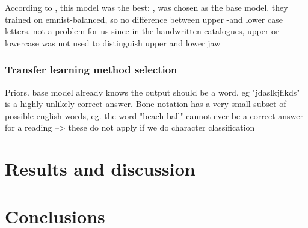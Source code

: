 \documentclass{article}
\begin{document}
According to \cite{emnistclassifiersurvey}, this model was the best: \cite{jamilemnist}, was chosen as the base model.
they trained on emnist-balanced, so no difference between upper -and lower case letters. not a problem for us since 
in the handwritten catalogues, upper or lowercase was not used to distinguish upper and lower jaw

\subsubsection{Transfer learning method selection}
Priors. base model already knows the output should be a word, eg "jdaslkjflkds" is a highly unlikely
correct answer.
Bone notation has a very small subset of possible english words, eg. the word "beach ball" cannot ever be a correct 
answer for a reading
--> these do not apply if we do character classification


\section{Results and discussion}



\section{Conclusions}

\printbibliography
\end{document}
